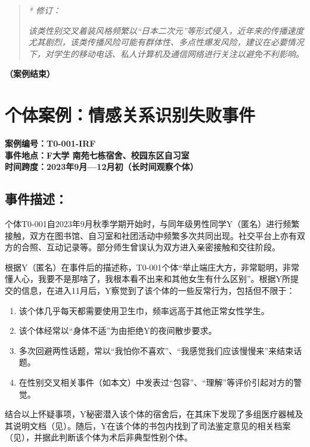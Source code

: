 \documentclass[]{ctexrep}
\begin{document}
	\begin{quotation}
		\textit{\hspace{-4em} * 修订：}
		
		\textit{该类性别交叉着装风格频繁以“日本二次元”等形式侵入，近年来的传播速度尤其剧烈，该类传播风险可能有群体性、多点性爆发风险，建议在必要情况下，对学生的移动电话、私人计算机及通信网络进行关注以避免不利影响。}
	\end{quotation}
	\begin{flushright}
	\textbf{（案例结束）}
	\end{flushright}
	
	\section{个体案例：情感关系识别失败事件}
	\label{3.4个体案例}
	\begin{center}
		\textbf{案例编号：T0-001-IRF\\
	事件地点：F大学 南苑七栋宿舍、校园东区自习室\\
	时间跨度：2023年9月—12月初（长时间观察个体）}
	\end{center}
	\subsection{事件描述：}
	个体T0-001自2023年9月秋季学期开始时，与同年级男性同学Y（匿名）进行频繁接触，双方在图书馆、自习室和社团活动中频繁多次共同出现。社交平台上亦有双方的合照、互动记录等。部分师生曾误认为双方进入亲密接触和交往阶段。
	
	根据Y（匿名）在事件后的描述称，T0-001个体“举止端庄大方，非常聪明，非常懂人心，我要不是那啥了，我根本看不出来和其他女生有什么区别”。根据Y所提交的信息，在进入11月后，Y察觉到了该个体的一些反常行为，包括但不限于：
	
	\begin{enumerate}
		\item 该个体几乎每天都需要使用卫生巾，频率远高于其他正常女性学生。
		
		\item 该个体经常以“身体不适”为由拒绝Y的夜间散步要求。
		
		\item 多次回避两性话题，常以“我怕你不喜欢”、“我感觉我们应该慢慢来”来结束话题。
		
		\item 在性别交叉相关事件（如本文\hyperref[案例3.3]{}）中发表过“包容”、“理解”等评价引起对方的警觉。
	\end{enumerate}
	结合以上怀疑事项，Y秘密潜入该个体的宿舍后，在其床下发现了多组医疗器械及其说明文档（见\hyperref[附件5.1]{}）。随后，Y在该个体的书包内找到了司法鉴定意见的相关档案（见\hyperref[附件5.2]{}），并据此判断该个体为术后非典型性别个体。
	
\end{document}
